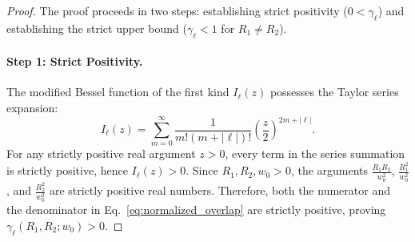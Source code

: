 \documentclass{optica-article}
\begin{document}
\begin{proof}
The proof proceeds in two steps: establishing strict positivity ($0 < \gamma_\ell$) and establishing the strict upper bound ($\gamma_\ell < 1$ for $R_1 \neq R_2$).

\paragraph{Step 1: Strict Positivity.}
The modified Bessel function of the first kind $I_\ell(z)$ possesses the Taylor series expansion:
\begin{equation}
I_\ell(z) = \sum_{m=0}^\infty \frac{1}{m! (m + |\ell|)!} \left( \frac{z}{2} \right)^{2m + |\ell|}.
\label{eq:bessel_taylor_series}
\end{equation}
For any strictly positive real argument $z > 0$, every term in the series summation is strictly positive, hence $I_\ell(z) > 0$. Since $R_1, R_2, w_0 > 0$, the arguments $\frac{R_1 R_2}{w_0^2}$, $\frac{R_1^2}{w_0^2}$, and $\frac{R_2^2}{w_0^2}$ are strictly positive real numbers. Therefore, both the numerator and the denominator in Eq.~\eqref{eq:normalized_overlap} are strictly positive, proving $\gamma_\ell(R_1, R_2; w_0) > 0$.


\end{proof}
\end{document}
